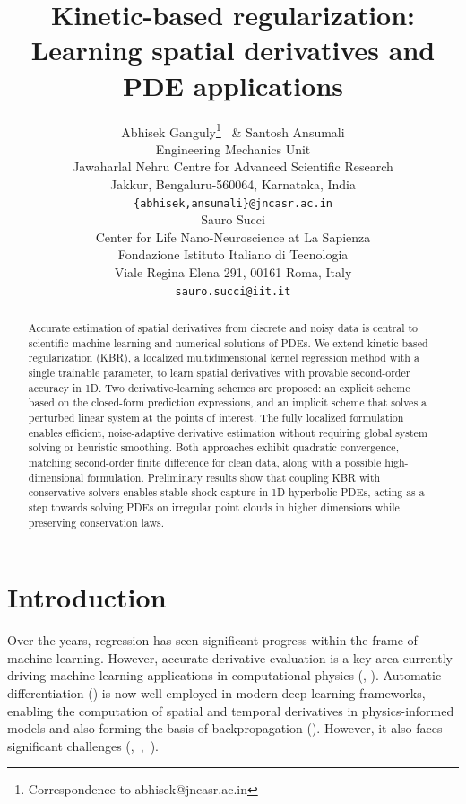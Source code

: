 \documentclass{article} %
\title{Kinetic-based regularization: Learning spatial derivatives and PDE applications}
\author{%
  Abhisek Ganguly\thanks{Correspondence to abhisek@jncasr.ac.in} \, \& Santosh Ansumali \\
  Engineering Mechanics Unit \\
  Jawaharlal Nehru Centre for Advanced Scientific Research \\
  Jakkur, Bengaluru-560064, Karnataka, India \\
  \texttt{\{abhisek,ansumali\}@jncasr.ac.in} \\[2ex]
  \AND
  Sauro Succi \\
  Center for Life Nano-Neuroscience at La Sapienza \\
  Fondazione Istituto Italiano di Tecnologia \\
  Viale Regina Elena 291, 00161 Roma, Italy \\
  \texttt{sauro.succi@iit.it}
}
\theoremstyle{plain}
\begin{document}
\maketitle
\begin{abstract}
Accurate estimation of spatial derivatives from discrete and noisy data is central to scientific machine learning and numerical solutions of PDEs. We extend kinetic-based regularization (KBR), a localized multidimensional kernel regression method with a single trainable parameter, to learn spatial derivatives with provable second-order accuracy in 1D. Two derivative-learning schemes are proposed: an explicit scheme based on the closed-form prediction expressions, and an implicit scheme that solves a perturbed linear system at the points of interest. The fully localized formulation enables efficient, noise-adaptive derivative estimation without requiring global system solving or heuristic smoothing. Both approaches exhibit quadratic convergence, matching second-order finite difference for clean data, along with a possible high-dimensional formulation. Preliminary results show that coupling KBR with conservative solvers enables stable shock capture in 1D hyperbolic PDEs, acting as a step towards solving PDEs on irregular point clouds in higher dimensions while preserving conservation laws.
\end{abstract}

\section{Introduction} 
Over the years, regression has seen significant progress within the frame of machine learning. However, accurate derivative evaluation is a key area currently driving machine learning applications in computational physics (\cite{wang2020explicit}, \cite{abramavicius2025evaluationderivativesusingapproximate}).
Automatic differentiation (\cite{baydin2018automatic}) is now well-employed in modern deep learning frameworks, enabling the computation of spatial and temporal derivatives in physics-informed models and also forming the basis of backpropagation (\cite{rumelhart1986learning}). However, it also faces significant challenges (\cite{gholami2019anode},~\cite{margossian2019review},~\cite{huckelheim2024adpitfalls}). 
\end{document}
